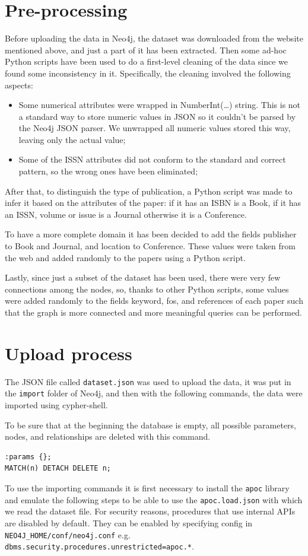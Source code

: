\section{Pre-processing}
\label{sec:pre_processing_neo4j}%
Before uploading the data in Neo4j, the dataset was downloaded from the website mentioned above, and just a part of it has been extracted.
Then some ad-hoc Python scripts have been used to do a first-level cleaning of the data since we found some inconsistency in it.
Specifically, the cleaning involved the following aspects:
\begin{itemize}
    \item Some numerical attributes were wrapped in NumberInt(\ldots) string.
    This is not a standard way to store numeric values in JSON so it couldn't be parsed by the Neo4j JSON parser.
    We unwrapped all numeric values stored this way, leaving only the actual value;
    \item Some of the ISSN attributes did not conform to the standard and correct pattern, so the wrong ones have been eliminated;
\end{itemize}
After that, to distinguish the type of publication, a Python script was made to infer it based on the attributes of the paper: if it has an ISBN is a Book, if it has an ISSN, volume or issue is a Journal otherwise it is a Conference.

To have a more complete domain it has been decided to add the fields publisher to Book and Journal, and location to Conference.
These values were taken from the web and added randomly to the papers using a Python script.

Lastly, since just a subset of the dataset has been used, there were very few connections among the nodes, so, thanks to other Python scripts, some values were added randomly to the fields keyword, fos, and references of each paper such that the graph is more connected and more meaningful queries can be performed.


\section{Upload process}
\label{sec:upload_process_neo4j}%
The JSON file called \verb|dataset.json| was used to upload the data, it was put in the \verb|import| folder of Neo4j, and then with the following commands, the data were imported using cypher-shell.

To be sure that at the beginning the database is empty, all possible parameters, nodes, and relationships are deleted with this command.
\begin{lstlisting}[label={lst:upload_process1}]
:params {};
MATCH(n) DETACH DELETE n;
\end{lstlisting}
To use the importing commands it is first necessary to install the \verb|apoc| library and emulate the following steps to be able to use the \verb|apoc.load.json| with which we read the dataset file.
For security reasons, procedures that use internal APIs are disabled by default.
They can be enabled by specifying config in \verb|NEO4J_HOME/conf/neo4j.conf| e.g. \verb|dbms.security.|\verb|procedures.unrestricted=apoc.*|.

